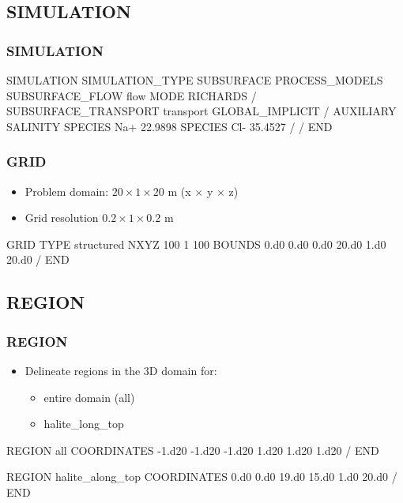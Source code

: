 \documentclass{beamer}
\newcommand\magentacomment[1]{{{\color{magenta} #1}}}
\begin{document}
\subsection{SIMULATION}
\begin{frame}\frametitle{SIMULATION}

\begin{semiverbatim}
SIMULATION
  SIMULATION_TYPE SUBSURFACE
  PROCESS_MODELS
    SUBSURFACE_FLOW flow
      MODE RICHARDS
    /
    SUBSURFACE_TRANSPORT transport
      GLOBAL_IMPLICIT
    /
    \magentacomment{AUXILIARY SALINITY
      SPECIES Na+ 22.9898
      SPECIES Cl- 35.4527
    /}
  /
END
\end{semiverbatim}

\end{frame}

\begin{frame}\frametitle{GRID}

\begin{itemize}
  \item Problem domain: $20 \times 1 \times 20$ m (x $\times$ y $\times$ z)
  \item Grid resolution $0.2 \times 1 \times 0.2$ m
\end{itemize}

\begin{semiverbatim}
GRID
  TYPE structured 
  NXYZ 100 1 100
  BOUNDS
    0.d0 0.d0 0.d0
    20.d0 1.d0 20.d0 
  /
END
\end{semiverbatim}

\end{frame}

\subsection{REGION}

\begin{frame}\frametitle{REGION}

\begin{itemize}
  \item Delineate regions in the 3D domain for:
  \begin{itemize}
    \item entire domain (all)
    \item halite\_long\_top
  \end{itemize}
\end{itemize}

\begin{semiverbatim}
REGION all
  COORDINATES
    \magentacomment{-1.d20 -1.d20 -1.d20
    1.d20 1.d20 1.d20}
  /
END

REGION halite\_along\_top
  COORDINATES
    0.d0 0.d0 19.d0
    15.d0 1.d0 20.d0
  /
END
\end{semiverbatim}

\end{frame}
\end{document}
